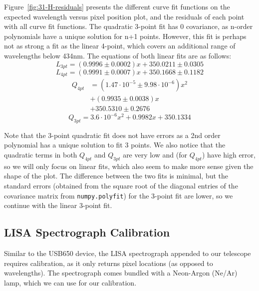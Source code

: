 \documentclass[twocolumn]{aastex702}
\begin{document}
			Figure~\ref{fig:31-H-residuals} presents the different curve fit functions on the expected wavelength versus pixel position plot, and the residuals of each point with all curve fit functions. The quadratic 3-point fit has 0 covariance, as n-order polynomials have a unique solution for n+1 points. However, this fit is perhaps not as strong a fit as the linear 4-point, which covers an additional range of wavelengths below 434nm. The equations of both linear fits are as follows:
			\begin{equation}\label{eq:31-cal-H3}
				L_{3pt} = (0.9996 \pm 0.0002) x + 350.0211 \pm 0.0305
			\end{equation}
			\begin{equation}\label{eq:31-cal-H4}
				L_{4pt} = (0.9991 \pm 0.0007) x + 350.1668 \pm 0.1182
			\end{equation}
			\begin{equation}\label{eq:31-cal-Hq3}
			\begin{split}
				Q_{4pt} & = (1.47 \cdot 10^{-5} \pm 9.98 \cdot 10^{-6}) x^2 \\
				& + (0.9935 \pm 0.0038) x \\
				& + 350.5310 \pm 0.2676
			\end{split}
			\end{equation}
			\begin{equation}\label{eq:31-cal-Hq3}
				Q_{3pt} = 3.6 \cdot 10^{-6} x^2 + 0.9982 x + 350.1334
			\end{equation}
			
			Note that the 3-point quadratic fit does not have errors as a 2nd order polynomial has a unique solution to fit 3 points. We also notice that the quadratic terms in both $Q_{4pt}$ and $Q_{3pt}$ are very low and (for $Q_{4pt}$) have high error, so we will only focus on linear fits, which also seem to make more sense given the shape of the plot. The difference between the two fits is minimal, but the standard errors (obtained from the square root of the diagonal entries of the covariance matrix from \texttt{numpy.polyfit}) for the 3-point fit are lower, so we continue with the linear 3-point fit.
		
		\subsection{LISA Spectrograph Calibration}\label{ssec:telescope-cal}
		
			Similar to the USB650 device, the LISA spectrograph appended to our telescope requires calibration, as it only returns pixel locations (as opposed to wavelengths). The spectrograph comes bundled with a Neon-Argon (Ne/Ar) lamp, which we can use for our calibration.
			
\end{document}
